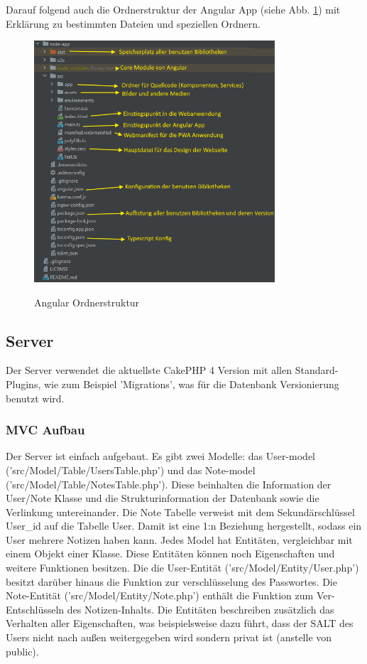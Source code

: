 \documentclass[12pt]{article}
\begin{document}
Darauf folgend auch die Ordnerstruktur der Angular App (siehe Abb. \ref{fig:path-angular}) mit Erklärung zu bestimmten Dateien und speziellen Ordnern.
\begin{figure}[h!]
    \caption{Angular Ordnerstruktur}
    \centering
    \includegraphics[width=0.8\textwidth]{angular-paths.png}
    \label{fig:path-angular}
\end{figure}


        \subsection{Server}

Der Server verwendet die aktuellste CakePHP 4 Version mit allen Standard-Plugins, wie zum Beispiel 'Migrations', was für die Datenbank Versionierung benutzt wird. 

            \subsubsection{MVC Aufbau}
            
Der Server ist einfach aufgebaut. Es gibt zwei Modelle: das User-model ('src/Model/Table/UsersTable.php') und das Note-model ('src/Model/Table/NotesTable.php'). Diese beinhalten die Information der User/Note Klasse und die Strukturinformation der Datenbank sowie die Verlinkung untereinander. Die Note Tabelle verweist mit dem Sekundärschlüssel User\_id auf die Tabelle User. Damit ist eine 1:n Beziehung hergestellt, sodass ein User mehrere Notizen haben kann. Jedes Model hat Entitäten, vergleichbar mit einem Objekt einer Klasse. Diese Entitäten können noch Eigenschaften und weitere Funktionen besitzen. Die die User-Entität ('src/Model/Entity/User.php') besitzt darüber hinaus die Funktion zur verschlüsselung des Passwortes. Die Note-Entität ('src/Model/Entity/Note.php') enthält die Funktion zum Ver-Entschlüsseln des Notizen-Inhalts. Die Entitäten beschreiben zusätzlich das Verhalten aller Eigenschaften, was beispielsweise dazu führt, dass der SALT des Users nicht nach außen weitergegeben wird sondern privat ist (anstelle von public).
\end{document}
